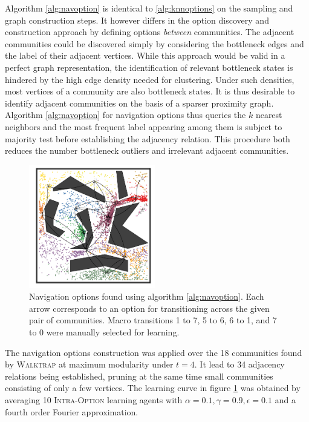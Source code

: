 Algorithm \ref{alg:navoption} is identical to \ref{alg:knnoptions} on the sampling and graph construction steps. It however differs in the option discovery and construction approach by defining options \textit{between} communities. The adjacent communities could be discovered simply by considering the bottleneck edges and the label of their adjacent vertices. While this approach would be valid in a perfect graph representation, the identification of relevant bottleneck states is hindered by the high edge density needed for clustering. Under such densities, most vertices of a community are also bottleneck states. It is thus desirable to identify adjacent communities on the basis of a sparser proximity graph. Algorithm \ref{alg:navoption} for navigation options thus queries the $k$ nearest neighbors and the most frequent label appearing among them is subject to majority test before establishing the adjacency relation. This procedure both reduces the number bottleneck outliers and irrelevant adjacent communities.

\begin{figure}
\centering
\includegraphics[width=0.49\textwidth]{fig/pinball-nav.pdf}
\caption{Navigation options found using algorithm \ref{alg:navoption}. Each arrow corresponds to an option for transitioning across the given pair of communities. Macro transitions 1 to 7, 5 to 6, 6 to 1, and 7 to 0 were manually selected for learning.}
\label{fig:nav-options}
\end{figure}

The navigation options construction was applied over the 18 communities found by \textsc{Walktrap} at maximum modularity under $t=4$. It lead to 34 adjacency relations being established, pruning at the same time small communities consisting of only a few vertices. The learning curve in figure \ref{fig:nav-options} was obtained by averaging 10 \textsc{Intra-Option} learning agents with $\alpha = 0.1, \gamma = 0.9, \epsilon = 0.1$ and a fourth order Fourier approximation. 

